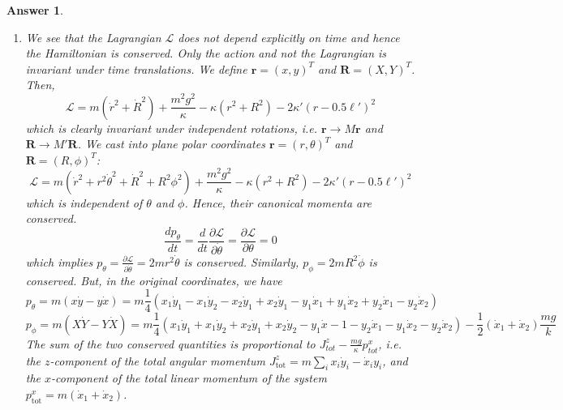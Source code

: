 \documentclass[a4paper]{article}
\newtheorem{ans}{Answer}[section]
\theoremstyle{new}
\begin{document}
\begin{ans}
\begin{enumerate}[label=(\alph*)]
$$\omega=0,\quad\omega^2=(x_0^2+y_0^2)\frac{(\kappa+2\kappa')^3}{(\kappa'\ell')^2m}=\frac{\kappa'^2\ell'^2}{(\kappa+2\kappa')^2}\frac{(\kappa+2\kappa')^3}{(\kappa'\ell')^2m}=\frac{\kappa+2\kappa'}{m}$$
where their eigenvectors (normal modes) respectively are
$$\begin{pmatrix}\delta x\\\delta y\\\end{pmatrix}=\begin{pmatrix}y_0\\-x_0\\\end{pmatrix},\quad\begin{pmatrix}\delta x\\\delta y\\\end{pmatrix}=\begin{pmatrix}x_0\\y_0\\\end{pmatrix}$$
where the former (zero-frequency mode) is due to rotational symmetry in the $(x,y)$ plane.
\item We see that the Lagrangian $\mathcal{L}$ does not depend explicitly on time and hence the Hamiltonian is conserved. Only the action and not the Lagrangian is invariant under time translations. We define $\boldsymbol{r}=(x,y)^T$ and $\mathbf{R}=(X,Y)^T$. Then, 
$$\mathcal{L}=m(\dot{r}^2+\dot{R}^2)+\frac{m^2g^2}{\kappa}-\kappa(r^2+R^2)-2\kappa'(r-0.5\ell')^2$$
which is clearly invariant under independent rotations, i.e. $\mathbf{r}\rightarrow M\mathbf{r}$ and $\mathbf{R}\rightarrow M'\mathbf{R}$. We cast into plane polar coordinates $\mathbf{r}=(r,\theta)^T$ and $\mathbf{R}=(R,\phi)^T$:
$$\mathcal{L}=m(\dot{r}^2+r^2\dot{\theta}^2+\dot{R}^2+R^2\phi^2)+\frac{m^2g^2}{\kappa}-\kappa(r^2+R^2)-2\kappa'(r-0.5\ell')^2$$
which is independent of $\theta$ and $\phi$. Hence, their canonical momenta are conserved.
$$\frac{dp_\theta}{dt}=\frac{d}{dt}\frac{\partial\mathcal{L}}{\partial\dot{\theta}}=\frac{\partial\mathcal{L}}{\partial\theta}=0$$
which implies $p_\theta=\frac{\partial\mathcal{L}}{\partial\dot{\theta}}=2mr^2\dot{\theta}$ is conserved. Similarly, $p_\phi=2mR^2\dot{\phi}$ is conserved. But, in the original coordinates, we have
$$p_\theta=m(x\dot{y}-y\dot{x})=m\frac{1}{4}(x_1\dot{y}_1-x_1\dot{y}_2-x_2\dot{y}_1+x_2\dot{y}_1-y_1\dot{x}_1+y_1\dot{x}_2+y_2\dot{x}_1-y_2\dot{x}_2)$$
$$p_\phi=m(X\dot{Y}-Y\dot{X})=m\frac{1}{4}(x_1\dot{y}_1+x_1\dot{y}_2+x_2\dot{y}_1+x_2\dot{y}_2-y_1\dot{x}-1-y_2\dot{x}_1-y_1\dot{x}_2-y_2\dot{x}_2)-\frac{1}{2}(\dot{x}_1+\dot{x}_2)\frac{mg}{k}$$
The sum of the two conserved quantities is proportional to $J^z_{tot}-\frac{mg}{\kappa}p_{tot}^x$, i.e. the $z$-component of the total angular momentum $J_{\text{tot}}^z=m\sum_ix_i\dot{y}_i-\dot{x}_iy_i$, and the $x$-component of the total linear momentum of the system $p_{\text{tot}}^x=m(\dot{x}_1+\dot{x}_2)$.
\end{enumerate}
\end{ans}
\newpage
\end{document}
